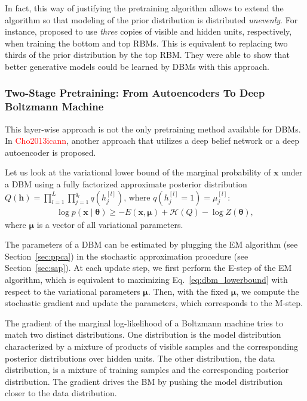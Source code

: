 \documentclass{now}
\newcommand{\qlay}[1]{\left[#1\right]}
\newcommand{\vect}[1]{\mathbf{#1}}
\newcommand{\vects}[1]{\boldsymbol{#1}}
\newcommand{\vh}[0]{\vect{h}}
\newcommand{\vx}[0]{\vect{x}}
\newcommand{\vmu}[0]{\vects{\mu}}
\newcommand{\TT}[0]{{\vects{\theta}}}
\newcommand{\alert}[1]{\textcolor{red}{#1}}
\newcommand{\HH}[0]{\mathcal{H}}
\newcommand{\citepub}[1]{\alert{#1}}
\begin{document}
In fact, this way of justifying the pretraining algorithm
allows to extend the algorithm so that 
modeling of the prior distribution is distributed
\textit{unevenly}. For instance, \citet{Salakhutdinov2012}
proposed to use \textit{three} copies of visible and hidden
units, respectively, when training the bottom and top RBMs.
This is equivalent to replacing two thirds of the prior
distribution by the top RBM. They were able to show that
better generative models could be learned by DBMs with this
approach.

\subsubsection{Two-Stage Pretraining: From Autoencoders To
Deep Boltzmann Machine}

This layer-wise approach is not the only pretraining method
available for DBMs. In \citepub{Cho2013icann}, another
approach that utilizes a deep belief network or a deep
autoencoder is proposed.

Let us look at the variational lower bound of the marginal
probability of $\vx$ under a DBM using a fully factorized
approximate posterior distribution \\
$Q(\vh) = \prod_{l=1}^L
\prod_{j=1}^{q_l} q(h_j^{\qlay{l}})$, where $q(h_j^{\qlay{l}}=1) =
\mu_j^{\qlay{l}}$:
\begin{align}
    \label{eq:dbm_lowerbound}
    \log p(\vx \mid \TT) \geq  -E (\vx, \vmu) + \HH(Q) - \log Z(\TT),
\end{align}
where $\vmu$ is a vector of all variational parameters.

The parameters of a DBM can be estimated by plugging the EM
algorithm (see Section~\ref{sec:ppca}) in the stochastic
approximation procedure (see Section~\ref{sec:sap}). At each
update step, we first perform the E-step of the EM
algorithm, which is equivalent to maximizing
Eq.~\eqref{eq:dbm_lowerbound} with respect to the
variational parameters $\vmu$. Then, with the fixed $\vmu$,
we compute the stochastic gradient and update the
parameters, which corresponds to the M-step.

The gradient of the marginal log-likelihood of a Boltzmann
machine tries to match two distinct distributions. One
distribution is the model distribution characterized by a
mixture of products of visible samples and the corresponding
posterior distributions over hidden units. The other
distribution, the data distribution, is a mixture of
training samples and the corresponding posterior
distribution. The gradient drives the BM by pushing the
model distribution closer to the data distribution.
\end{document}
